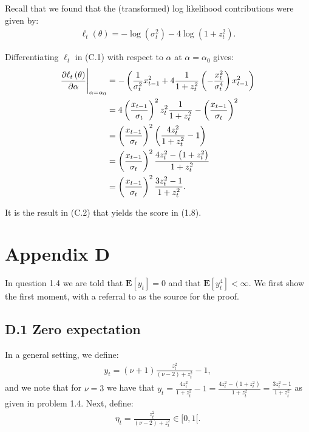 \documentclass[11pt,a4paper,oneside]{article}
\newcommand{\lp}{\left(}
\newcommand{\rp}{\right)}
\newcommand{\rb}{\right]}
\newcommand{\lb}{\left[}
\newcommand{\ee}{\mathbf{E}}
\begin{document}
Recall that we found that the (transformed) log likelihood contributions were given by:
\begin{align}
    \ell_t\lp \theta\rp = - \log\lp \sigma_t^2\rp - 4 \log \lp 1 + z_t^2\rp.
\end{align}

Differentiating $\ell_t$ in (C.1) with respect to $\alpha$ at $\alpha = \alpha_0$ gives:
\begin{align}
    \frac{\partial \ell_t\lp \theta\rp}{\partial \alpha}\Bigg \vert_{\alpha = \alpha_0} 
        &= -\lp \frac{1}{\sigma_t^2}x_{t-1}^2 + 4 \frac{1}{1 + z_t^2}\lp - \frac{x_t^2}{\sigma_t^4}\rp x_{t-1}^2\rp \notag \\
        &= 4 \lp \frac{x_{t-1}}{\sigma_t}\rp^2 z_t^2\frac{1}{1 + z_t^2} - \lp \frac{x_{t-1}}{\sigma_t}\rp^2\notag\\
        &= \lp \frac{x_{t-1}}{\sigma_t}\rp^2\lp \frac{4 z_t^2}{1 + z_t^2} - 1\rp\notag \\
        &= \lp \frac{x_{t-1}}{\sigma_t}\rp^2\frac{4 z_t^2 - \lp 1 + z_t^2\rp}{1 + z_t^2}\notag\\
        &= \lp \frac{x_{t-1}}{\sigma_t}\rp^2 \frac{3 z_t^2 - 1}{1 + z_t^2}.
\end{align}

It is the result in (C.2) that yields the score in (1.8).

\clearpage 

\section{Appendix D}
\renewcommand{\theequation}{D.\arabic{equation}}
\setcounter{equation}{0}
In question 1.4 we are told that $\ee\lb y_t\rb = 0$ and that $\ee\lb y_t^4 \rb < \infty$. We first show the first moment, with a referral to \cite{PedersenRahbek} as the source for the proof.

\subsection{D.1 Zero expectation}
In a general setting, we define:
\begin{align}
    y_t = \lp \nu + 1 \rp \frac{z_t^2}{\lp \nu - 2\rp + z_t^2} - 1,
\end{align}
and we note that for $\nu = 3$ we have that $y_t = \frac{4 z_t^2}{1 + z_t^2} - 1 = \frac{4 z_t^2 - \lp 1 + z_t^2\rp}{1+ z_t^2} = \frac{3 z_t^2 - 1}{1 + z_t^2}$ as given in problem 1.4. Next, define:
\begin{align}
    \eta_t = \frac{z_t^2}{\lp \nu - 2\rp + z_t^2} \in [0, 1[.
\end{align}
\end{document}
